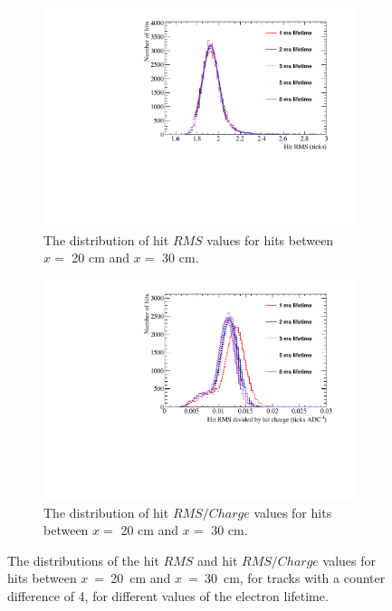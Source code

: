 \begin{figure}
  \centering
  \begin{subfigure}{0.48\textwidth}
    \centering
    \includegraphics[width=\textwidth]{Canvas_RMS_20cm_ElecLifetime}
    \caption{The distribution of hit $RMS$ values for hits between $x =$ 20 cm and $x =$ 30 cm.}
  \end{subfigure}%
  \hspace{0.03\textwidth}%
  \begin{subfigure}{0.48\textwidth}
    \centering
    \includegraphics[width=\textwidth]{Canvas_RMS_Q_20cm_ElecLifetime}
    \caption{The distribution of hit $RMS/Charge$ values for hits between $x =$ 20 cm and $x =$ 30 cm.}
  \end{subfigure}
  \caption[The distributions of the hit $RMS$ and hit $RMS/Charge$ values for tracks with a counter difference of 4, for different values of the electron lifetime]
          {The distributions of the hit $RMS$ and hit $RMS/Charge$ values for hits between $x$~=~20~cm and $x$~=~30~cm, for tracks with a counter difference of 4, for different values of the electron lifetime.}
  \label{fig:DiffLifeStudy_HitFit}
\end{figure}

